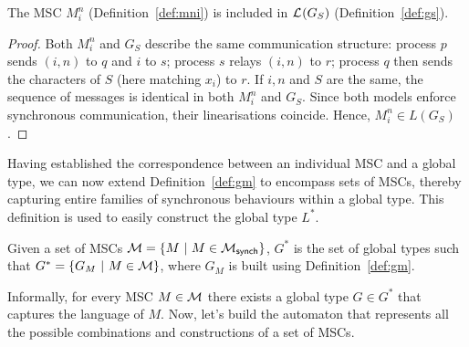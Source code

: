 \begin{lemma}\label{lmm:msgs}
The MSC $M^n_i$ (Definition~\ref{def:mni}) is included in 
$\mathcal{L}_{}^{}(G_S)$ (Definition~\ref{def:gs}).
\end{lemma}

\begin{proof}
	Both $M^n_i$ and $G_S$ describe the same communication structure:
	process $p$ sends $(i,n)$ to $q$ and $i$ to $s$;
	process $s$ relays $(i,n)$ to $r$;
	process $q$ then sends the characters of $S$ (here matching $x_i$) to $r$.
	If $i,n$ and $S$ are the same, the sequence of messages is identical in both 
	$M^n_i$ and $G_S$. Since both models enforce synchronous communication, 
	their linearisations coincide. Hence, $M^n_i \in L(G_S)$.
\end{proof}

Having established the correspondence between an individual MSC and a  
global type, we can now extend Definition~\ref{def:gm} to encompass  
sets of MSCs, thereby capturing entire families of synchronous  
behaviours within a global type. This definition is used to easily 
construct the global type $L^*$.

\bigskip

\begin{definition}[$G^*$]\label{def:gstar}
	Given a set of MSCs $\mathcal{M} =\{M\ |\ M\in\mscsetofmodel{\synchmodel}\}$,
	$G^*$ is the set of global types such that $G^*=\{G_M\ |\ M \in \mathcal{M}\}$,
	where $G_M$ is built using Definition~\ref{def:gm}.
\end{definition}

Informally, for every MSC $M\in\mathcal{M}$ there exists a global type $G\in G^*$ that
captures the language of $M$. Now, let's build the automaton that represents
all the possible combinations and constructions of a set of MSCs.

\bigskip

